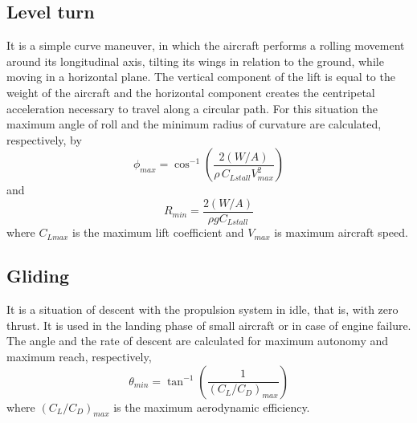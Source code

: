 \documentclass[10pt]{SelfArx} %
\begin{document}
\subsection{Level turn}
It is a simple curve maneuver, in which the aircraft performs a rolling movement around its longitudinal axis, tilting its wings in relation to the ground, while moving in a horizontal plane. The vertical component of the lift is equal to the weight of the aircraft and the horizontal component creates the centripetal acceleration necessary to travel along a circular path. For this  situation the maximum angle of roll and the minimum radius of curvature are calculated, respectively, by
\begin{equation} \label{eq: phimax} 
\phi_ {max} = \cos ^ {- 1} \left (\frac {2(W / A)} {\rho\, C_ {Lstall} V_ {max} ^ 2}  \right) 
\end{equation} 
and
\begin{equation} \label{eq: Rmin} 
R_ {min} = \frac {2(W / A)} {\rho g C_ {Lstall}}
\end{equation} 
where  $C_ {Lmax}$ is the maximum lift coefficient and  $V_ {max}$ is maximum aircraft speed.

\subsection{Gliding}
It is a situation of descent with the propulsion system in idle, that is, with zero thrust. It is used in the landing phase of small aircraft or in case of engine failure. The angle and the rate of descent are calculated for maximum autonomy and maximum reach, respectively,
\begin{equation}
\theta_ {min} = \tan ^ {- 1} \left (\frac {1} {(C_L / C_D) _ {max}} \right) 
\end{equation}
where $(C_L / C_D) _ {max}$ is the maximum aerodynamic efficiency.

\end{document}
